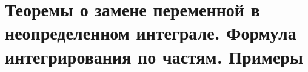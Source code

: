 \section{Теоремы о замене переменной в неопределенном интеграле. Формула интегрирования по частям. Примеры}